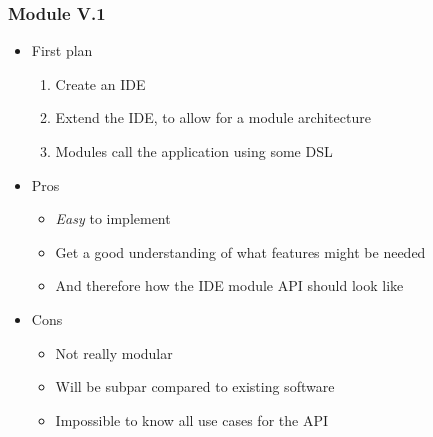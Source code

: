 \begin{frame}
  \frametitle{Module V.1}
  \begin{itemize}
    \item First plan
      \pause
      \begin{enumerate}
        \item Create an IDE
          \pause
        \item Extend the IDE, to allow for a module architecture
          \pause
        \item Modules call the application using some DSL
          \pause
      \end{enumerate}
    \item Pros
      \pause
      \begin{itemize}
        \item \textit{Easy} to implement
          \pause
        \item Get a good understanding of what features might be needed
          \pause
        \item And therefore how the IDE module API should look like
      \end{itemize}
    \item Cons
      \pause
      \begin{itemize}
        \item Not really modular
          \pause
        \item Will be subpar compared to existing software
          \pause
        \item Impossible to know all use cases for the API
      \end{itemize}
  \end{itemize}
\end{frame}

